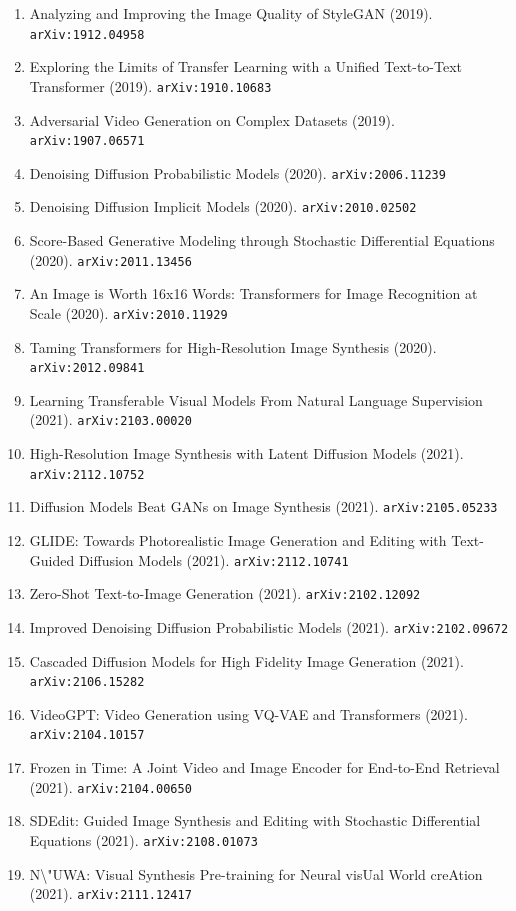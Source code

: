 \documentclass[11pt]{article}
\begin{document}
\begin{enumerate}
  \item Analyzing and Improving the Image Quality of StyleGAN (2019). \texttt{arXiv:1912.04958}
  \item Exploring the Limits of Transfer Learning with a Unified Text-to-Text
  Transformer (2019). \texttt{arXiv:1910.10683}
  \item Adversarial Video Generation on Complex Datasets (2019). \texttt{arXiv:1907.06571}
  \item Denoising Diffusion Probabilistic Models (2020). \texttt{arXiv:2006.11239}
  \item Denoising Diffusion Implicit Models (2020). \texttt{arXiv:2010.02502}
  \item Score-Based Generative Modeling through Stochastic Differential
  Equations (2020). \texttt{arXiv:2011.13456}
  \item An Image is Worth 16x16 Words: Transformers for Image Recognition at
  Scale (2020). \texttt{arXiv:2010.11929}
  \item Taming Transformers for High-Resolution Image Synthesis (2020). \texttt{arXiv:2012.09841}
  \item Learning Transferable Visual Models From Natural Language Supervision (2021). \texttt{arXiv:2103.00020}
  \item High-Resolution Image Synthesis with Latent Diffusion Models (2021). \texttt{arXiv:2112.10752}
  \item Diffusion Models Beat GANs on Image Synthesis (2021). \texttt{arXiv:2105.05233}
  \item GLIDE: Towards Photorealistic Image Generation and Editing with
  Text-Guided Diffusion Models (2021). \texttt{arXiv:2112.10741}
  \item Zero-Shot Text-to-Image Generation (2021). \texttt{arXiv:2102.12092}
  \item Improved Denoising Diffusion Probabilistic Models (2021). \texttt{arXiv:2102.09672}
  \item Cascaded Diffusion Models for High Fidelity Image Generation (2021). \texttt{arXiv:2106.15282}
  \item VideoGPT: Video Generation using VQ-VAE and Transformers (2021). \texttt{arXiv:2104.10157}
  \item Frozen in Time: A Joint Video and Image Encoder for End-to-End Retrieval (2021). \texttt{arXiv:2104.00650}
  \item SDEdit: Guided Image Synthesis and Editing with Stochastic Differential
  Equations (2021). \texttt{arXiv:2108.01073}
  \item N\textbackslash{}"UWA: Visual Synthesis Pre-training for Neural visUal World creAtion (2021). \texttt{arXiv:2111.12417}

\end{enumerate}
\end{document}
